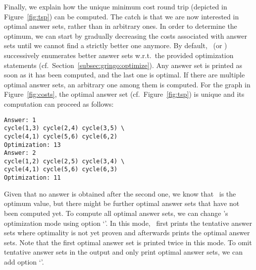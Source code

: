 Finally, we explain how the unique minimum cost round trip
(depicted in Figure~\ref{fig:tsp}) can be computed.
The catch is that we are now interested in optimal answer sets,
rather than in arbitrary ones.
In order to determine the optimum, we can start by gradually
decreasing the costs associated with answer sets
until we cannot find a strictly better one anymore.
By default,
\clasp\ (or \clingo) successively enumerates better answer sets
w.r.t.\ the provided optimization statements (cf.\ Section~\ref{subsec:gringo:optimize}).
Any answer set is printed as soon as it has been computed,
and the last one is optimal.
If there are multiple optimal answer sets, an arbitrary one among them is computed.
For the graph in Figure~\ref{fig:costs},
the optimal answer set (cf.\ Figure~\ref{fig:tsp}) is unique
and its computation can proceed as follows:%
%
\begin{lstlisting}[numbers=none]
Answer: 1
cycle(1,3) cycle(2,4) cycle(3,5) \
cycle(4,1) cycle(5,6) cycle(6,2)
Optimization: 13
Answer: 2
cycle(1,2) cycle(2,5) cycle(3,4) \
cycle(4,1) cycle(5,6) cycle(6,3)
Optimization: 11
\end{lstlisting}
%
Given that no answer is obtained after the second one,
we know that~ is the optimum value,
but there might be further optimal answer sets that have not been computed yet.
To compute all optimal answer sets,
we can change \clasp's optimization mode using option
`\code{--opt-mode=optN}'.
In this mode, \clasp\ first prints the tentative answer sets where optimality is not yet proven and afterwards prints the optimal answer sets.
Note that the first optimal answer set is printed twice in this mode.
To omit tentative answer sets in the output and only print optimal answer sets,
we can add option `\code{--quiet=1}'.

